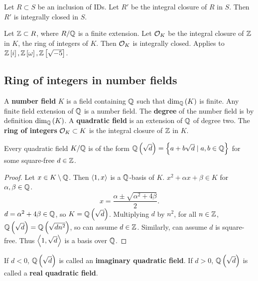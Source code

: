 \begin{theorem}
Let $ R \subset S $ be an inclusion of IDs. Let $ R' $ be the integral closure of $ R $ in $ S $. Then $ R' $ is integrally closed in $ S $.
\end{theorem}

\begin{example*}
Let $ \mathbb{Z} \subset R $, where $ R / \mathbb{Q} $ is a finite extension. Let $ \mathcal{O}_K $ be the integral closure of $ \mathbb{Z} $ in $ K $, the ring of integers of $ K $. Then $ \mathcal{O}_K $ is integrally closed. Applies to $ \mathbb{Z}\left[ i \right], \mathbb{Z}\left[ \omega \right], \mathbb{Z}\left[ \sqrt{-5} \right] $.
\end{example*}

\pagebreak

\subsection{Ring of integers in number fields}

A \textbf{number field} $ K $ is a field containing $ \mathbb{Q} $ such that $ \dim_{\mathbb{Q}}\left( K \right) $ is finite. Any finite field extension of $ \mathbb{Q} $ is a number field. The \textbf{degree} of the number field is by definition $ \dim_{\mathbb{Q}}\left( K \right) $. A \textbf{quadratic field} is an extension of $ \mathbb{Q} $ of degree two. The \textbf{ring of integers} $ \mathcal{O}_K \subset K $ is the integral closure of $ \mathbb{Z} $ in $ K $.

\begin{lemma}
Every quadratic field $ K / \mathbb{Q} $ is of the form $ \mathbb{Q}\left( \sqrt{d} \right) = \left\{ a + b\sqrt{d} \mid a, b \in \mathbb{Q} \right\} $ for some square-free $ d \in \mathbb{Z} $.
\end{lemma}

\begin{proof}
Let $ x \in K \setminus \mathbb{Q} $. Then $ \left\langle 1, x \right\rangle $ is a $ \mathbb{Q} $-basis of $ K $. $ x^2 + \alpha x + \beta \in K $ for $ \alpha, \beta \in \mathbb{Q} $.
$$ x = \dfrac{\alpha \pm\sqrt{\alpha^2 + 4\beta}}{2}. $$
$ d = \alpha^2 + 4\beta \in \mathbb{Q} $, so $ K = \mathbb{Q}\left( \sqrt{d} \right) $. Multiplying $ d $ by $ n^2 $, for all $ n \in \mathbb{Z} $, $ \mathbb{Q}\left( \sqrt{d} \right) = \mathbb{Q}\left( \sqrt{dn^2} \right) $, so can assume $ d \in \mathbb{Z} $. Similarly, can assume $ d $ is square-free. Thus $ \left\langle 1, \sqrt{d} \right\rangle $ is a basis over $ \mathbb{Q} $.
\end{proof}

\begin{remark*}
If $ d < 0 $, $ \mathbb{Q}\left( \sqrt{d} \right) $ is called an \textbf{imaginary quadratic field}. If $ d > 0 $, $ \mathbb{Q}\left( \sqrt{d} \right) $ is called a \textbf{real quadratic field}.
\end{remark*}

